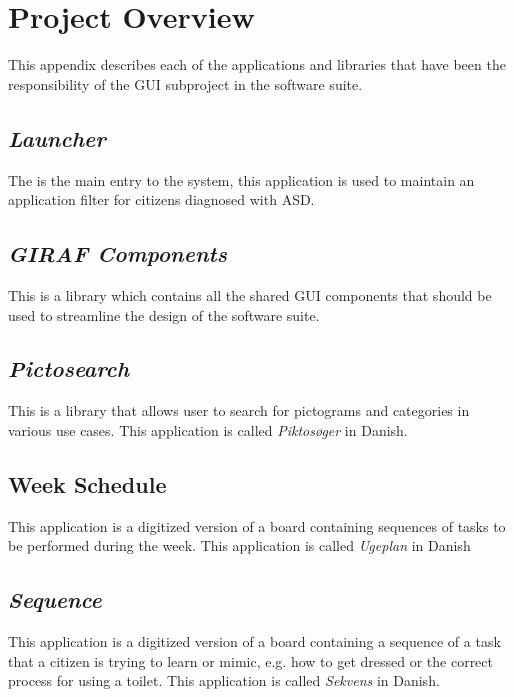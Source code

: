 \chapter{Project Overview} %
\label{cha:project_overview}

This appendix describes each of the applications and libraries that have been the responsibility of the GUI subproject in the \giraf software suite. 

\section{\emph{Launcher}}
\label{sec:app_launcher}
The \launcher is the main entry to the system, this application is used to maintain an application filter for citizens diagnosed with ASD.

\section{\emph{GIRAF Components}}
\label{sec:app_giraf_components}
This is a library which contains all the shared GUI components that should be used to streamline the design of the \giraf software suite.

\section{\emph{Pictosearch}}
\label{sec:app_pictosearch}
This is a library that allows user to search for pictograms and categories in various use cases. This application is called \emph{Piktosøger} in Danish.

\section{Week Schedule}
\label{sec:app_week_schedule}
This application is a digitized version of a board containing sequences of tasks to be performed during the week. This application is called \emph{Ugeplan} in Danish 

\section{\emph{Sequence}}
\label{sec:app_sequence}
This application is a digitized version of a board containing a sequence of a task that a citizen is trying to learn or mimic, e.g. how to get dressed or the correct process for using a toilet. This application is called \emph{Sekvens} in Danish.

